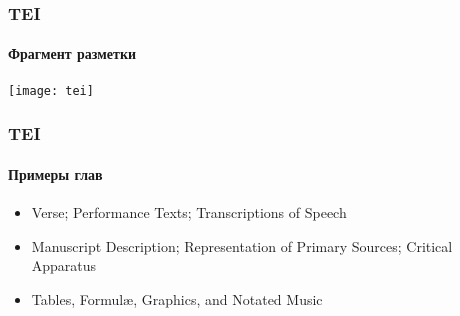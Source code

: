 \begin{frame}
  \frametitle{TEI}
  \framesubtitle{Фрагмент разметки}

  \begin{center}
    \texttt{[image: tei]}
  \end{center}
\end{frame}

\begin{frame}
  \frametitle{TEI}
  \framesubtitle{Примеры глав}

  \begin{itemize}
    \item Verse; Performance Texts; Transcriptions of Speech
    \item Manuscript Description; Representation of Primary Sources; Critical Apparatus
    \item Tables, Formulæ, Graphics, and Notated Music
  \end{itemize}
\end{frame}
